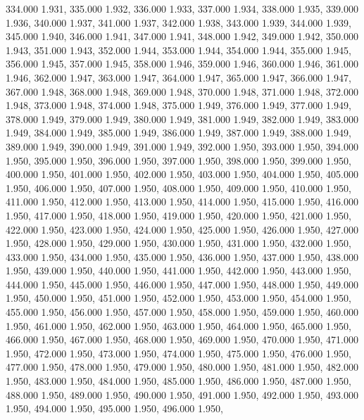 334.000 1.931, 
335.000 1.932, 
336.000 1.933, 
337.000 1.934, 
338.000 1.935, 
339.000 1.936, 
340.000 1.937, 
341.000 1.937, 
342.000 1.938, 
343.000 1.939, 
344.000 1.939, 
345.000 1.940, 
346.000 1.941, 
347.000 1.941, 
348.000 1.942, 
349.000 1.942, 
350.000 1.943, 
351.000 1.943, 
352.000 1.944, 
353.000 1.944, 
354.000 1.944, 
355.000 1.945, 
356.000 1.945, 
357.000 1.945, 
358.000 1.946, 
359.000 1.946, 
360.000 1.946, 
361.000 1.946, 
362.000 1.947, 
363.000 1.947, 
364.000 1.947, 
365.000 1.947, 
366.000 1.947, 
367.000 1.948, 
368.000 1.948, 
369.000 1.948, 
370.000 1.948, 
371.000 1.948, 
372.000 1.948, 
373.000 1.948, 
374.000 1.948, 
375.000 1.949, 
376.000 1.949, 
377.000 1.949, 
378.000 1.949, 
379.000 1.949, 
380.000 1.949, 
381.000 1.949, 
382.000 1.949, 
383.000 1.949, 
384.000 1.949, 
385.000 1.949, 
386.000 1.949, 
387.000 1.949, 
388.000 1.949, 
389.000 1.949, 
390.000 1.949, 
391.000 1.949, 
392.000 1.950, 
393.000 1.950, 
394.000 1.950, 
395.000 1.950, 
396.000 1.950, 
397.000 1.950, 
398.000 1.950, 
399.000 1.950, 
400.000 1.950, 
401.000 1.950, 
402.000 1.950, 
403.000 1.950, 
404.000 1.950, 
405.000 1.950, 
406.000 1.950, 
407.000 1.950, 
408.000 1.950, 
409.000 1.950, 
410.000 1.950, 
411.000 1.950, 
412.000 1.950, 
413.000 1.950, 
414.000 1.950, 
415.000 1.950, 
416.000 1.950, 
417.000 1.950, 
418.000 1.950, 
419.000 1.950, 
420.000 1.950, 
421.000 1.950, 
422.000 1.950, 
423.000 1.950, 
424.000 1.950, 
425.000 1.950, 
426.000 1.950, 
427.000 1.950, 
428.000 1.950, 
429.000 1.950, 
430.000 1.950, 
431.000 1.950, 
432.000 1.950, 
433.000 1.950, 
434.000 1.950, 
435.000 1.950, 
436.000 1.950, 
437.000 1.950, 
438.000 1.950, 
439.000 1.950, 
440.000 1.950, 
441.000 1.950, 
442.000 1.950, 
443.000 1.950, 
444.000 1.950, 
445.000 1.950, 
446.000 1.950, 
447.000 1.950, 
448.000 1.950, 
449.000 1.950, 
450.000 1.950, 
451.000 1.950, 
452.000 1.950, 
453.000 1.950, 
454.000 1.950, 
455.000 1.950, 
456.000 1.950, 
457.000 1.950, 
458.000 1.950, 
459.000 1.950, 
460.000 1.950, 
461.000 1.950, 
462.000 1.950, 
463.000 1.950, 
464.000 1.950, 
465.000 1.950, 
466.000 1.950, 
467.000 1.950, 
468.000 1.950, 
469.000 1.950, 
470.000 1.950, 
471.000 1.950, 
472.000 1.950, 
473.000 1.950, 
474.000 1.950, 
475.000 1.950, 
476.000 1.950, 
477.000 1.950, 
478.000 1.950, 
479.000 1.950, 
480.000 1.950, 
481.000 1.950, 
482.000 1.950, 
483.000 1.950, 
484.000 1.950, 
485.000 1.950, 
486.000 1.950, 
487.000 1.950, 
488.000 1.950, 
489.000 1.950, 
490.000 1.950, 
491.000 1.950, 
492.000 1.950, 
493.000 1.950, 
494.000 1.950, 
495.000 1.950, 
496.000 1.950, 
